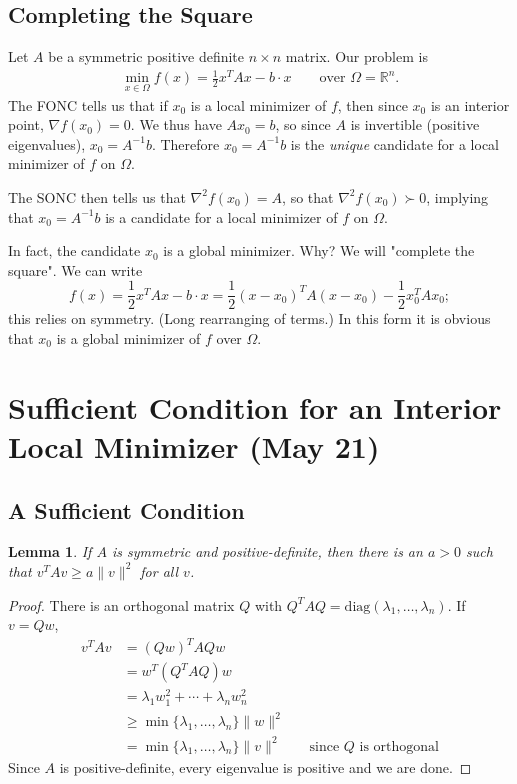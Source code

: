 \documentclass[11pt]{book}
\newcommand{\R}{\mathbb{R}}
\newtheorem{lemma}{Lemma}[subsection]
\begin{document}
\subsection{Completing the Square}

Let $A$ be a symmetric positive definite $n \times n$ matrix. Our problem is 
\begin{align*}
\min_{x \in \Omega} f(x) = \frac{1}{2} x^T Ax - b \cdot x \qquad \text{over } \Omega = \R^n.
\end{align*} 
The FONC tells us that if $x_0$ is a local minimizer of $f$, then since $x_0$ is an interior point, $\nabla f(x_0) = 0$. We thus have $Ax_0 = b$, so since $A$ is invertible (positive eigenvalues), $x_0 = A^{-1}b$. Therefore $x_0 = A^{-1}b$ is the \emph{unique} candidate for a local minimizer of $f$ on $\Omega$.


The SONC then tells us that $\nabla^2 f(x_0) = A$, so that $\nabla^2 f(x_0) \succ 0$, implying that $x_0   = A^{-1}b$ is a candidate for a local minimizer of $f$ on $\Omega$.

In fact, the candidate $x_0$ is a global minimizer. Why? We will "complete the square". We can write
\[
f(x) = 	\frac{1}{2} x^T Ax - b \cdot x = \frac{1}{2}(x - x_0)^T A(x-x_0) - \frac{1}{2} x_0^T A x_0;
\]
this relies on symmetry. (Long rearranging of terms.) In this form it is obvious that $x_0$ is a global minimizer of $f$ over $\Omega$.

\newpage


\section{Sufficient Condition for an Interior Local Minimizer (May 21)}

\subsection{A Sufficient Condition}
\begin{lemma} 
If $A$ is symmetric and positive-definite, then  there is an $a > 0$ such that $v^T A v \geq a \|v\|^2$ for all $v$.
\end{lemma}
\begin{proof}
There is an orthogonal matrix $Q$ with $Q^T A Q = \mathrm{diag}(\lambda_1, \dots, \lambda_n)$. If $v = Qw$,
\begin{align*}
v^T A v &= (Qw)^T A Qw \\
&= w^T (Q^T A Q) w \\
&= \lambda_1 w_1^2 + \cdots + \lambda_n w_n^2 \\
&\geq \min\{\lambda_1, \dots, \lambda_n\} \|w\|^2 \\
&= \min\{\lambda_1, \dots, \lambda_n\} \|v\|^2 \qquad \text{since $Q$ is orthogonal}
\end{align*}
Since $A$ is positive-definite, every eigenvalue is positive and we are done.
\end{proof}
\end{document}
